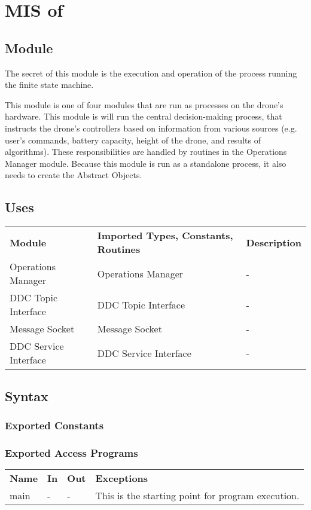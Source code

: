 \documentclass[12pt, titlepage]{article}
\begin{document}
\section{MIS of } \label{MIS_DDC_MAIN_MODULE} 
\subsection{Module}
The secret of this module is the execution and operation of the process running the finite state machine.   

This module is one of four modules that are run as processes on the drone's hardware. This module is will run the central decision-making process, that instructs the drone's controllers based on information from various sources (e.g. user's commands, battery capacity, height of the drone, and results of algorithms). These responsibilities are handled by routines in the Operations Manager module. Because this module is run as a standalone process, it also needs to create the Abstract Objects.

\subsection{Uses}
\begin{center}
\begin{tabular}{p{2 cm} p{5cm} p{6.5cm} } 
\hline
\textbf{Module} & \textbf{Imported Types, Constants, Routines} & \textbf{Description} \\
Operations Manager & Operations Manager & -\\
DDC Topic Interface & DDC Topic Interface & - \\
Message Socket & Message Socket & - \\
DDC Service Interface & DDC Service Interface & - \\
\hline
\hline
\end{tabular}
\end{center}
\subsection{Syntax}
\subsubsection{Exported Constants}
\subsubsection{Exported Access Programs}
\begin{center}
\begin{tabular}{p{3.5cm} p{2.5cm} p{2.5cm} p{5cm}}
\hline
\textbf{Name} & \textbf{In} & \textbf{Out} & \textbf{Exceptions} \\
main & - & - & This is the starting point for program execution. \\
\hline
\hline
\end{tabular}
\end{center}
\end{document}
